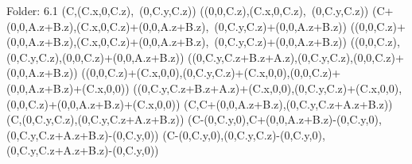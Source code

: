 Folder: 6.1
\left(C,\left(C.x,0,C.z\right),\ \left(0,C.y,C.z\right)\right)
\left(\left(0,0,C.z\right),\left(C.x,0,C.z\right),\ \left(0,C.y,C.z\right)\right)
\left(C+\left(0,0,A.z+B.z\right),\left(C.x,0,C.z\right)+\left(0,0,A.z+B.z\right),\ \left(0,C.y,C.z\right)+\left(0,0,A.z+B.z\right)\right)
\left(\left(0,0,C.z\right)+\left(0,0,A.z+B.z\right),\left(C.x,0,C.z\right)+\left(0,0,A.z+B.z\right),\ \left(0,C.y,C.z\right)+\left(0,0,A.z+B.z\right)\right)
\left(\left(0,0,C.z\right),\left(0,C.y,C.z\right),\left(0,0,C.z\right)+\left(0,0,A.z+B.z\right)\right)
\left(\left(0,C.y,C.z+B.z+A.z\right),\left(0,C.y,C.z\right),\left(0,0,C.z\right)+\left(0,0,A.z+B.z\right)\right)
\left(\left(0,0,C.z\right)+\left(C.x,0,0\right),\left(0,C.y,C.z\right)+\left(C.x,0,0\right),\left(0,0,C.z\right)+\left(0,0,A.z+B.z\right)+\left(C.x,0,0\right)\right)
\left(\left(0,C.y,C.z+B.z+A.z\right)+\left(C.x,0,0\right),\left(0,C.y,C.z\right)+\left(C.x,0,0\right),\left(0,0,C.z\right)+\left(0,0,A.z+B.z\right)+\left(C.x,0,0\right)\right)
\left(C,C+\left(0,0,A.z+B.z\right),\left(0,C.y,C.z+A.z+B.z\right)\right)
\left(C,\left(0,C.y,C.z\right),\left(0,C.y,C.z+A.z+B.z\right)\right)
\left(C-\left(0,C.y,0\right),C+\left(0,0,A.z+B.z\right)-\left(0,C.y,0\right),\left(0,C.y,C.z+A.z+B.z\right)-\left(0,C.y,0\right)\right)
\left(C-\left(0,C.y,0\right),\left(0,C.y,C.z\right)-\left(0,C.y,0\right),\left(0,C.y,C.z+A.z+B.z\right)-\left(0,C.y,0\right)\right)


